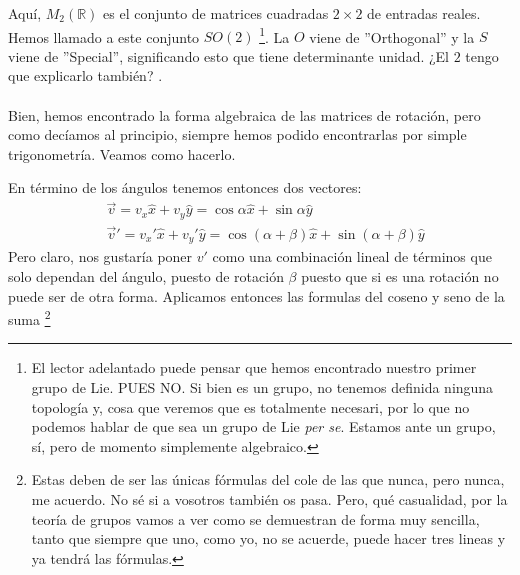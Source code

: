 \documentclass[12pt]{article}
\begin{document}
Aquí, $ M_2(\mathbb{R})$ es el conjunto de matrices cuadradas $2\times 2$ de entradas reales. Hemos llamado a este conjunto $SO(2)$ \footnote{El lector adelantado puede pensar que hemos encontrado nuestro primer grupo de Lie. PUES NO. Si bien es un grupo, no tenemos definida ninguna topología y, cosa que veremos que es totalmente necesari, por lo que no podemos hablar de que sea un grupo de Lie \textit{per se}. Estamos ante un grupo, sí, pero de momento simplemente algebraico.  }. La $O$ viene de ''Orthogonal'' y la $S$ viene de ''Special'',  significando esto que tiene determinante unidad. ¿El $2$ tengo que explicarlo también? .\\\\
Bien, hemos encontrado la forma algebraica de las matrices de rotación, pero como decíamos al principio, siempre hemos podido encontrarlas por simple trigonometría. Veamos como hacerlo.
\begin{center}
\end{center}
\begin{center}
\end{center}
En término de los ángulos tenemos entonces dos vectores:
\begin{equation*}
    \begin{split}
        & \vec v =v_x\hat x+v_y \hat y= \cos \alpha \hat x +\sin \alpha \hat y \\
        &\vec v' =v_x'\hat x+v_y' \hat y= \cos (\alpha +\beta) \hat x +\sin (\alpha +\beta) \hat y
    \end{split}
\end{equation*}
Pero claro, nos gustaría poner $v'$ como una combinación lineal de términos que solo dependan del ángulo, puesto de rotación $\beta$ puesto que si es una rotación no puede ser de otra forma. Aplicamos entonces las formulas del coseno y seno de la suma \footnote{Estas deben de ser las únicas fórmulas del cole de las que nunca, pero nunca, me acuerdo. No sé si a vosotros también os pasa. Pero, qué casualidad, por la teoría de grupos vamos a ver como se demuestran de forma muy sencilla, tanto que siempre que uno, como yo, no se acuerde, puede hacer tres lineas y ya tendrá las fórmulas. }
\end{document}
